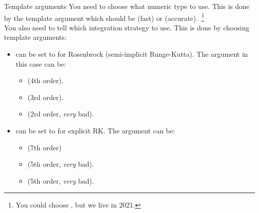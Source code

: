\documentclass[10pt,utf8,compress,xcolor=dvipsnames]{beamer}
\begin{document}
\begin{frame}[fragile]{Template arguments}
	You need to choose what numeric type to use. This is done by the template argument  which should be  (fast) or  (accurate).~\footnote{\fontF You could choose , but we live in 2021.}\\[0.5cm]
	
	
	You also need to tell \mimes which integration strategy to use. This is done by choosing template arguments:
	\begin{itemize}
		\item {} can be set to  for Rosenbrock (semi-implicit Runge-Kutta). 
		The  argument in this case can be:\\[-0.0cm]
		\begin{itemize}
			\item {} (4th order).
			\item {} (3rd order).
			\item {} (2rd order, {\em very} bad).
		\end{itemize}
		\item {} can be set to  for explicit RK.
		The  argument can be:\\[-0.0cm]
		\begin{itemize}
			\item {} (7th order)
			\item {} (5th order, {\em very} bad).
			\item {} (5th order, {\em very} bad).
		\end{itemize}	
	\end{itemize}
\end{frame}
\end{document}
